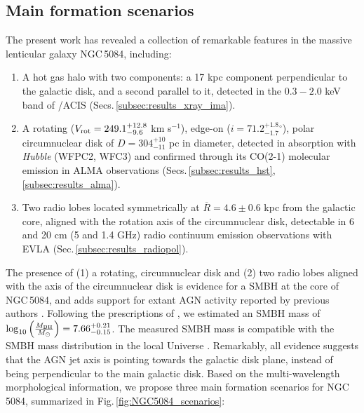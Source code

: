 \documentclass[modern]{CORE-AAS/aastex631}
\begin{document}
{\subsection{Main formation scenarios}
\label{subsec:discussion_main_formation_scenarios}
The present work has revealed a collection of remarkable features in the massive lenticular galaxy NGC\,5084, including: 
\begin{enumerate}

    \item A hot gas halo with two components: a 17 kpc component perpendicular to the galactic disk, and a second parallel to it, detected in the $0.3-2.0$ keV band of \Chandra/ACIS (Secs.\,\ref{subsec:results_xray_ima}). 

    \item A rotating ($V_{\rm rot} = 249.1^{+12.8}_{-9.6}$ km s$^{-1}$), edge-on ($i=71.2^{+1.8}_{-1.7}$$^{\circ}$), polar circumnuclear disk of $D=304^{+10}_{-11}$ pc in diameter, detected in absorption with \emph{Hubble} (WFPC2, WFC3) and confirmed through its CO(2-1) molecular emission in ALMA  observations (Secs.\,\ref{subsec:results_hst}, \,\ref{subsec:results_alma}).
    
    \item Two radio lobes located symmetrically at $\overline{R}=4.6\pm0.6$ kpc from the galactic core, aligned with the rotation axis of the circumnuclear disk, detectable in 6 and 20 cm (5 and 1.4 GHz) radio continuum emission observations with EVLA (Sec.\,\ref{subsec:results_radiopol}).  
    
    
\end{enumerate}

The presence of (1) a rotating, circumnuclear disk and (2) two radio lobes aligned with the axis of the circumnuclear disk is evidence for a SMBH at the core of NGC\,5084, and adds support for extant AGN activity reported by previous authors \citep{kewley+2001apj556_121}. Following the prescriptions of \citet{smith+2021mnras500_1933}, we estimated an SMBH mass of $\log_{10}\left( \frac{M_{\rm BH}}{M_{\odot}} \right) = 7.66^{+0.21}_{-0.15}$. The measured SMBH mass is compatible with the SMBH mass distribution in the local Universe \citep{vika+2009mnras400_1451, smith+2021mnras500_1933}. Remarkably, all evidence suggests that the AGN jet axis is pointing towards the galactic disk plane, instead of being perpendicular to the main galactic disk. Based on the multi-wavelength morphological information, we propose three main formation scenarios for NGC\,5084, summarized in Fig.\,\ref{fig:NGC5084_scenarios}:

}
\end{document}
